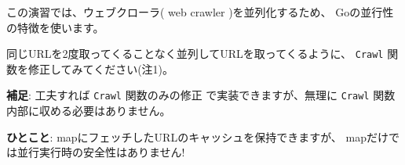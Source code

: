 この演習では、ウェブクローラ( web crawler )を並列化するため、
Goの並行性の特徴を使います。

同じURLを2度取ってくることなく並列してURLを取ってくるように、 
\texttt{Crawl} 関数を修正してみてください(注1)。

\textbf{補足}: 工夫すれば \texttt{Crawl} 関数のみの修正
で実装できますが、無理に \texttt{Crawl} 関数内部に収める必要はありません。

\textbf{ひとこと}: mapにフェッチしたURLのキャッシュを保持できますが、
mapだけでは並行実行時の安全性はありません!